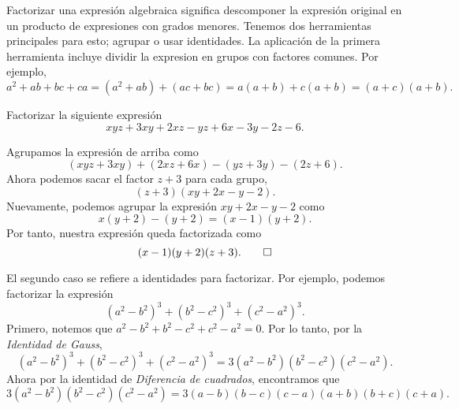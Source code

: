 Factorizar una expresión algebraica significa descomponer la expresión original en un producto de expresiones con grados menores.
Tenemos dos herramientas principales para esto; agrupar o usar identidades.
La aplicación de la primera herramienta incluye dividir la expresion en grupos con factores comunes.
Por ejemplo,
\[
    a^2 + ab + bc + ca = (a^2 + ab) + (ac + bc) = a(a + b) + c(a + b) = (a + c)(a + b).
\]

\begin{example}
    Factorizar la siguiente expresión
    \[
        xyz + 3xy + 2xz - yz + 6x - 3y - 2z - 6.
    \]
\end{example}
\begin{solution}
    Agrupamos la expresión de arriba como
    \[
        (xyz + 3xy) + (2xz + 6x) - (yz + 3y) - (2z + 6).
    \]
    Ahora podemos sacar el factor $z + 3$ para cada grupo,
    \[
        (z + 3)(xy + 2x - y - 2).
    \]
    Nuevamente, podemos agrupar la expresión $xy + 2x - y - 2$ como
    \[
        x(y + 2) - (y + 2) = (x - 1)(y + 2).
    \]
    Por tanto, nuestra expresión queda factorizada como
    \[
        (x - 1)(y + 2)(z + 3). \qedhere
    \]
\end{solution}

El segundo caso se refiere a identidades para factorizar.
Por ejemplo, podemos factorizar la expresión
\[
    (a^2 - b^2)^3 + (b^2 - c^2)^3 + (c^2 - a^2)^3.
\]
Primero, notemos que $a^2 - b^2 + b^2 - c^2 + c^2 - a^2 = 0$.
Por lo tanto, por la \textit{Identidad de Gauss},
\[
    (a^2 - b^2)^3 + (b^2 - c^2)^3 + (c^2 - a^2)^3 = 3 (a^2 - b^2)(b^2 - c^2)(c^2 - a^2).
\]
Ahora por la identidad de \textit{Diferencia de cuadrados}, encontramos que
\[
    3 (a^2 - b^2)(b^2 - c^2)(c^2 - a^2) = 3 (a - b)(b - c)(c - a) (a + b)(b + c)(c + a).
\]

